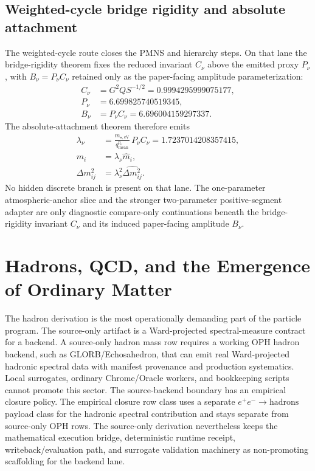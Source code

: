 \documentclass[11pt]{article}
\begin{document}
\subsection{Weighted-cycle bridge rigidity and absolute attachment}

The weighted-cycle route closes the PMNS and hierarchy steps. On that lane the
bridge-rigidity theorem fixes the reduced invariant \(C_\nu\) above the emitted
proxy \(P_\nu\), with \(B_\nu=P_\nu C_\nu\) retained only as the paper-facing
amplitude parameterization:
\[
\begin{aligned}
C_\nu&=G^2Q S^{-1/2}=0.9994295999075177,\\
P_\nu&=6.699825740519345,\\
B_\nu&=P_\nu C_\nu=6.696004159297337.
\end{aligned}
\]
The absolute-attachment theorem therefore emits
\[
\begin{aligned}
\lambda_\nu&=\frac{m_{\star,\mathrm{eV}}}{q_{\mathrm{mean}}^{p_\nu}}\,P_\nu C_\nu=1.7237014208357415,\\
m_i&=\lambda_\nu \hat m_i,\\
\Delta m_{ij}^2&=\lambda_\nu^2\widehat{\Delta m_{ij}^2}.
\end{aligned}
\]
No hidden discrete branch is present on that lane. The one-parameter atmospheric-anchor slice and
the stronger two-parameter positive-segment adapter are only diagnostic compare-only
continuations beneath the bridge-rigidity invariant \(C_\nu\) and its induced paper-facing amplitude \(B_\nu\).

\section{Hadrons, QCD, and the Emergence of Ordinary Matter}

The hadron derivation is the most operationally demanding part of the particle program. The
source-only artifact is a Ward-projected spectral-measure contract for a backend. A source-only
hadron mass row requires a working OPH hadron backend, such as GLORB/Echosahedron, that can emit
real Ward-projected hadronic spectral data with manifest provenance and production systematics.
Local surrogates, ordinary Chrome/Oracle workers, and bookkeeping scripts cannot promote this
sector. The source-backend boundary has an empirical closure policy. The empirical closure row class uses a separate
\(e^+e^-\to\mathrm{hadrons}\) payload class for the hadronic spectral contribution and stays
separate from source-only OPH rows. The
source-only derivation nevertheless keeps the mathematical execution bridge, deterministic runtime
receipt, writeback/evaluation path,
and surrogate validation machinery as non-promoting scaffolding for the backend lane.
\end{document}
